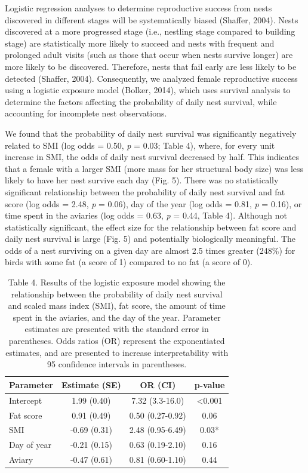 \documentclass[
]{article}
\begin{document}
Logistic regression analyses to determine reproductive success from
nests discovered in different stages will be systematically biased
(Shaffer, 2004). Nests discovered at a more progressed stage (i.e.,
nestling stage compared to building stage) are statistically more likely
to succeed and nests with frequent and prolonged adult visits (such as
those that occur when nests survive longer) are more likely to be
discovered. Therefore, nests that fail early are less likely to be
detected (Shaffer, 2004). Consequently, we analyzed female reproductive
success using a logistic exposure model (Bolker, 2014), which uses
survival analysis to determine the factors affecting the probability of
daily nest survival, while accounting for incomplete nest observations.

We found that the probability of daily nest survival was significantly
negatively related to SMI (log odds = 0.50, \emph{p} = 0.03; Table 4),
where, for every unit increase in SMI, the odds of daily nest survival
decreased by half. This indicates that a female with a larger SMI (more
mass for her structural body size) was less likely to have her nest
survive each day (Fig. 5). There was no statistically significant
relationship between the probability of daily nest survival and fat
score (log odds = 2.48, \emph{p} = 0.06), day of the year (log odds =
0.81, \emph{p} = 0.16), or time spent in the aviaries (log odds = 0.63,
\emph{p} = 0.44, Table 4). Although not statistically significant, the
effect size for the relationship between fat score and daily nest
survival is large (Fig. 5) and potentially biologically meaningful. The
odds of a nest surviving on a given day are almost 2.5 times greater
(248\%) for birds with some fat (a score of 1) compared to no fat (a
score of 0).

\begin{table}

\caption{\label{tab:logexp}Table 4. Results of the logistic exposure model showing the relationship between the probability of daily nest survival and scaled mass index (SMI), fat score, the amount of time spent in the aviaries, and the day of the year. Parameter estimates are presented with the standard error in parentheses. Odds ratios (OR) represent the exponentiated estimates, and are presented to increase interpretability with 95 confidence intervals in parentheses.}
\centering
\begin{tabular}[t]{lccc}
\toprule
Parameter & Estimate (SE) & OR (CI) & p-value\\
\midrule
Intercept & 1.99 (0.40) & 7.32 (3.3-16.0) & <0.001\\
Fat score & 0.91 (0.49) & 0.50 (0.27-0.92) & 0.06\\
SMI & -0.69 (0.31) & 2.48 (0.95-6.49) & 0.03*\\
Day of year & -0.21 (0.15) & 0.63 (0.19-2.10) & 0.16\\
Aviary & -0.47 (0.61) & 0.81 (0.60-1.10) & 0.44\\
\bottomrule
\end{tabular}
\end{table}
\end{document}
